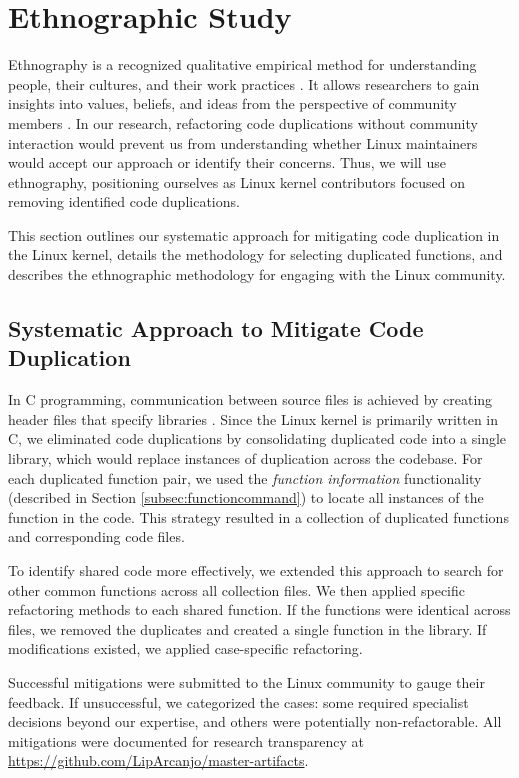 \section{Ethnographic Study}

\label{sec:meteth}

Ethnography is a recognized qualitative empirical method for understanding people, 
their cultures, and their work practices \citep{bookethno}. It allows researchers 
to gain insights into values, beliefs, and ideas from the perspective of community 
members \citep{ethnosoft}. In our research, refactoring code duplications without 
community interaction would prevent us from understanding whether Linux maintainers 
would accept our approach or identify their concerns. Thus, we will use ethnography, 
positioning ourselves as Linux kernel contributors focused on removing identified 
code duplications.

This section outlines our systematic approach for mitigating code duplication in the Linux kernel, details the methodology for selecting duplicated functions, and describes the ethnographic methodology for engaging with the Linux community.

\subsection{Systematic Approach to Mitigate Code Duplication}
\label{subsec:pipeline}

In C programming, communication between source files is achieved by creating header files that specify libraries \citep{Cbook}. Since the Linux kernel is primarily written in C, we eliminated code duplications by consolidating duplicated code into a single library, which would replace instances of duplication across the codebase.
%
For each duplicated function pair, we used the \textit{function information} functionality (described in Section \ref{subsec:functioncommand}) to locate all instances of the function in the code. This strategy resulted in a collection of duplicated functions and corresponding code files.

To identify shared code more effectively, we extended this approach to search for other common functions across all collection files. We then applied specific refactoring methods to each shared function. If the functions were identical across files, we removed the duplicates and created a single function in the library. If modifications existed, we applied case-specific refactoring.

Successful mitigations were submitted to the Linux community to gauge their feedback. If unsuccessful, we categorized the cases: some required specialist decisions beyond our expertise, and others were potentially non-refactorable. All mitigations were documented for research transparency at \url{https://github.com/LipArcanjo/master-artifacts}.

